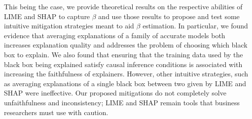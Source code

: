 \documentclass[mnsc,blindrev]{informs3}
\begin{document}
    This being the case, we provide theoretical results on the respective abilities of LIME and SHAP to capture $\beta$ and use those results to propose and test some intuitive mitigation strategies meant to aid $\beta$ estimation. In particular, we found evidence that averaging explanations of a family of accurate models both increases explanation quality and addresses the problem of choosing which black box to explain. We also found that ensuring that the training data used by the black box being explained satisfy causal inference conditions is associated with increasing the faithfulness of explainers. However, other intuitive strategies, such as averaging explanations of a single black box between two given by LIME and SHAP were ineffective. Our proposed mitigations do not completely solve unfaithfulness and inconsistency; LIME and SHAP remain tools that business researchers must use with caution. %

    

    
\end{document}
